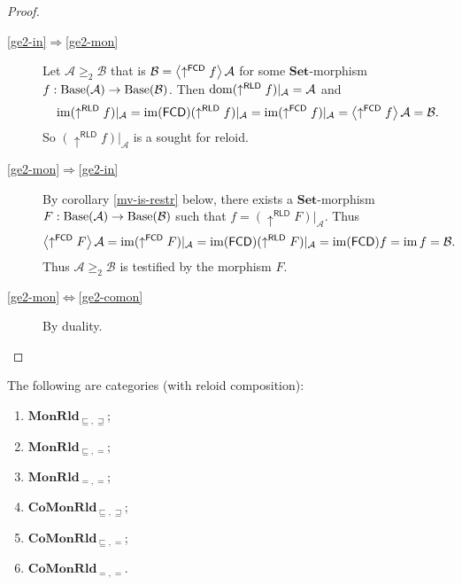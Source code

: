 \begin{proof}
~
\begin{description}
\item [{\ref{ge2-in}$\Rightarrow$\ref{ge2-mon}}] Let $\mathcal{A}\ge_{2}\mathcal{B}$
that is $\mathcal{B}=\left\langle \uparrow^{\mathsf{FCD}}f\right\rangle\mathcal{A}$
for some $\mathbf{Set}$-morphism $f:\operatorname{Base}(\mathcal{A})\rightarrow\operatorname{Base}(\mathcal{B})$.
Then $\operatorname{dom}(\uparrow^{\mathsf{RLD}}f)|_{\mathcal{A}}=\mathcal{A}$
and 
\[
\operatorname{im}(\uparrow^{\mathsf{RLD}}f)|_{\mathcal{A}}=\operatorname{im}(\mathsf{FCD})(\uparrow^{\mathsf{RLD}}f)|_{\mathcal{A}}=\operatorname{im}(\uparrow^{\mathsf{FCD}}f)|_{\mathcal{A}}=\left\langle \uparrow^{\mathsf{FCD}}f\right\rangle\mathcal{A}=\mathcal{B}.
\]
So $(\uparrow^{\mathsf{RLD}}f)|_{\mathcal{A}}$ is a sought for reloid.
\item [{\ref{ge2-mon}$\Rightarrow$\ref{ge2-in}}] By corollary \ref{mv-is-restr}
below, there exists a $\mathbf{Set}$-morphism $F:\operatorname{Base}(\mathcal{A})\rightarrow\operatorname{Base}(\mathcal{B})$
such that $f=(\uparrow^{\mathsf{RLD}}F)|_{\mathcal{A}}$. Thus
\[
\left\langle \uparrow^{\mathsf{FCD}}F\right\rangle\mathcal{A}=\operatorname{im}(\uparrow^{\mathsf{FCD}}F)|_{\mathcal{A}}=\operatorname{im}(\mathsf{FCD})(\uparrow^{\mathsf{RLD}}F)|_{\mathcal{A}}=\operatorname{im}(\mathsf{FCD}) f=\operatorname{im} f=\mathcal{B}.
\]
Thus $\mathcal{A}\ge_{2}\mathcal{B}$ is testified by the morphism
$F$.
\item [{\ref{ge2-mon}$\Leftrightarrow$\ref{ge2-comon}}] By duality.
\end{description}
\end{proof}
\begin{thm}
The following are categories (with reloid composition):
\begin{enumerate}
\item \label{monrld-le-ge}$\mathbf{MonRld}_{\sqsubseteq,\sqsupseteq}$;
\item \label{monrld-le-eq}$\mathbf{MonRld}_{\sqsubseteq,=}$;
\item \label{monrld-eq-eq}$\mathbf{MonRld}_{=,=}$;
\item $\mathbf{CoMonRld}_{\sqsubseteq,\sqsupseteq}$;
\item $\mathbf{CoMonRld}_{\sqsubseteq,=}$;
\item $\mathbf{CoMonRld}_{=,=}$.
\end{enumerate}
\end{thm}
